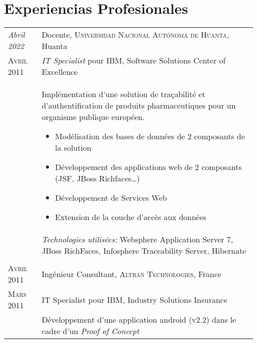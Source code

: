 \section{\texorpdfstring{\color{Blue}{\faSuitcase} Experiencias Profesionales}{Experiencias Profesionales}}
\begin{longtable}{R{2.5cm}|p{14.8cm}}
	\emph{Abril 2022}       & Docente, \textsc{Universidad Nacional Autónoma de Huanta}, Huanta                                                                         \\
	\textsc{Avril 2011}     & \emph{IT Specialist} pour IBM, Software Solutions Center of Excellence                                                                    \\&
	\footnotesize{
		Implémentation d'une solution de traçabilité et d'authentification
		de produits pharmaceutiques pour un organisme publique européen.
		\begin{itemize}
			\item Modélisation des bases de données de 2 composants de la solution
			\item Développement des applications web de 2 composants (JSF, JBoss Richfaces\ldots)
			\item Développement de Services Web
			\item Extension de la couche d'accès aux données
		\end{itemize}
		\vspace{-1em}
	}                                                                                                                                                                   \\&
	\footnotesize{\emph{Technologies utilisées:} Websphere Application Server 7, JBoss RichFaces, Infosphere Traceability Server, Hibernate }                           \\
	                                                                                                                                                \\
	\textsc{Avril 2011}     & Ingénieur Consultant, \textsc{Altran Technologies}, France                                                                                \\
	\textsc{Mars 2011}      & IT Specialist pour IBM, Industry Solutions Insurance                                                                                      \\&
	\footnotesize{Développement d'une application android (v2.2) dans le cadre d'un \emph{Proof of Concept}
}
\end{longtable}
